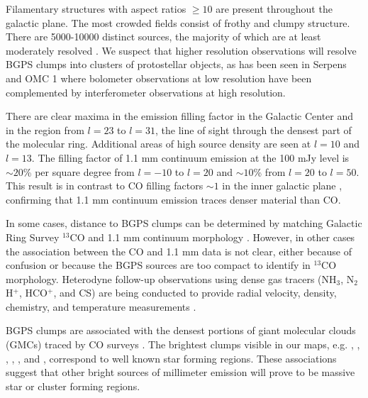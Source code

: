 \documentclass[12pt,preprint]{aastex}
\begin{document}

Filamentary structures with aspect ratios $\geq 10$ are present
throughout the galactic plane.  The most crowded fields consist of
frothy and clumpy structure.  There are 5000-10000 distinct sources,
the majority of which are at least moderately resolved
\citep{rosolowsky09}.  We suspect that higher resolution observations
will resolve BGPS clumps into clusters of protostellar objects, as has
been seen in Serpens \citep{enoch08,Testi1998} and OMC 1
\citep{Beuther2004,johnstone99} where bolometer observations at low
resolution have been complemented by interferometer observations at
high resolution.

There are clear maxima in the emission filling factor in the Galactic
Center and in the region from $l=23$ to $l=31$, the line of sight
through the densest part of the molecular ring.  Additional areas of
high source density are seen at $l=10$ and $l=13$.  The filling factor
of 1.1 mm continuum emission at the 100 mJy level is $\sim 20$\% per
square degree from $l=-10$ to $l=20$ and $\sim 10$\% from $l=20$ to
$l=50$.
This result is in contrast to CO filling factors $\sim1$ in the inner galactic
plane \citep{dame01,FCRAO}, confirming that 1.1 mm continuum emission traces
denser material than CO.  

In some cases, distance to BGPS clumps can be determined by matching
Galactic Ring Survey $^{13}$CO and 1.1 mm continuum morphology
\citep{IRDCdistance,FCRAO}.  However, in other cases the association
between the CO and 1.1 mm data is not clear, either because of
confusion or because the BGPS sources are too compact to identify in
$^{13}$CO morphology.  Heterodyne follow-up observations using dense
gas tracers (NH$_3$, N$_2$H$^+$, HCO$^+$, and CS) are being conducted
to provide radial velocity, density, chemistry, and temperature
measurements \citep{schlingman09, battersby09, nordhaus09}.

BGPS clumps are associated with the densest portions of giant
molecular clouds (GMCs) traced by CO surveys
\citep[e.g.,][]{dame01,FCRAO}.  The brightest clumps visible in our
maps, e.g. , , ,
, , and , correspond to well
known star forming regions.
These associations suggest that other bright sources of millimeter
emission will prove to be massive star or cluster forming regions.
\end{document}
